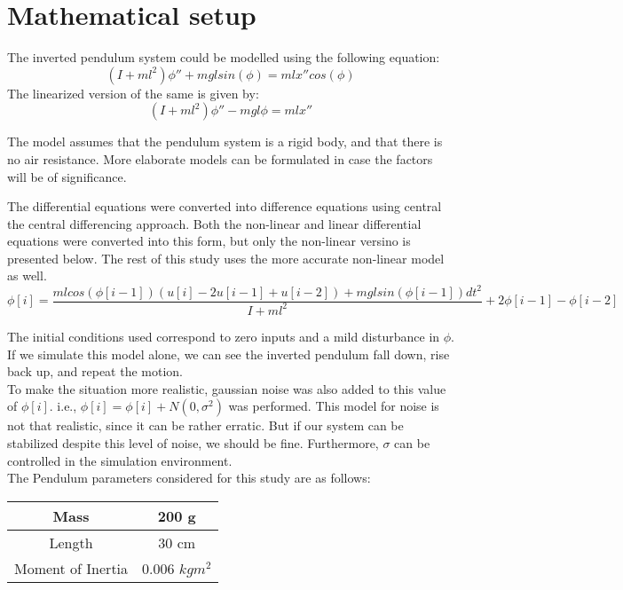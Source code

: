 \section{Mathematical setup}

The inverted pendulum system could be modelled using the following equation: $$(I + ml^2)\phi'' + mgl sin(\phi) = mlx'' cos(\phi) $$
The linearized version of the same is given by: $$ (I + ml^2)\phi'' - mgl\phi = mlx'' $$

The model assumes that the pendulum system is a rigid body, and that there is no air resistance. More elaborate models can be formulated in case the factors will be of significance.

\pagebreak

The differential equations were converted into difference equations using central the central differencing approach. Both the non-linear and linear differential equations were converted into this form, but only the non-linear versino is presented below. The rest of this study uses the more accurate non-linear model as well. $$ \phi[i] = \frac{mlcos(\phi[i-1])(u[i]-2u[i-1]+u[i-2])+mglsin(\phi[i-1])dt^2}{I+ml^2}+2\phi[i-1]-\phi[i-2] $$

The initial conditions used correspond to zero inputs and a mild disturbance in $\phi$. If we simulate this model alone, we can see the inverted pendulum fall down, rise back up, and repeat the motion. \\

To make the situation more realistic, gaussian noise was also added to this value of $\phi[i]$. i.e., $\phi[i] = \phi[i] + N(0,\sigma^2)$ was performed. This model for noise is not that realistic, since it can be rather erratic. But if our system can be stabilized despite this level of noise, we should be fine. Furthermore, $\sigma$ can be controlled in the simulation environment. \\

The Pendulum parameters considered for this study are as follows: \cite{ref2}
\begin{center}
\begin{tabular}{ | c | c | }
	\hline
	Mass 			& 	200 g \\
	\hline
	Length 			&	30 cm \\  
	\hline
	Moment of Inertia	&	0.006 $kg m^2$ \\
	\hline
\end{tabular}
\end{center}